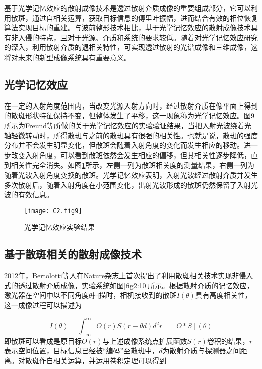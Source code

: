 基于光学记忆效应的散射成像技术是透过散射介质成像的重要组成部分，它可以利用散斑，通过自相关运算，获取目标信息的傅里叶振幅，进而结合有效的相位恢复算法实现目标的重建。与波前整形技术相比，基于光学记忆效应的散射成像技术具有非入侵的特点，且对于光源、介质和系统的要求较低。随着对光学记忆效应研究的深入，利用散射介质的退相关特性，可实现透过散射的光谱成像和三维成像，这将对未来的新型成像系统具有重要意义。

\subsection{光学记忆效应}

在一定的入射角度范围内，当改变光源入射方向时，经过散射介质在像平面上得到的散斑形状特征保持不变，但整体发生了平移，这一现象称为光学记忆效应。图9所示为Freund等所做的关于光学记忆效应的实验验证结果，当把入射光波绕着光轴轻微转动时，所得散斑与之前的散斑具有很强的相关性。也就是说，散斑的强度分布并不会发生明显变化，但散斑会随着入射角度的变化而发生相应的移动。进一步改变入射角度，可以看到散斑依然会发生相应的偏移，但其相关性逐步降低，直到相关性完全消失。如图\ref{fig2:9}所示，左侧一列为散斑相关度的测量结果，右侧一列为随着光波入射角度变换的散斑。光学记忆效应表明，入射光波经过散射介质并发生多次散射后，随着入射角度在小范围变化，出射光波形成的散斑仍然保留了入射光波的有效信息。

\begin{figure}[htp]
	\centering
	\texttt{[image: C2.fig9]}
	\caption{光学记忆效应实验结果}
	\label{fig2:9}
\end{figure}

\subsection{基于散斑相关的散射成像技术}

2012年，Bertolotti等人在Nature杂志上首次提出了利用散斑相关技术实现非侵入式的透过散射介质成像，实验系统如图\ref{fig2:10}所示。根据散射介质的记忆效应，激光器在空间中以不同角度$\theta$扫描时，相机接收到的散斑$I(\theta)$具有高度相关性，这一成像过程可以描述为

\begin{equation}
  I(\theta)= \int_{-\infty}^{\infty} O(r)S(r-\theta d) d^2 r = [O*S](\theta)
\label{eq:2.4}
\end{equation}
即散斑可以看成是原目标$O(r)$与上述成像系统点扩展函数$S(r)$卷积的结果，$r$表示空间位置，目标信息已经被“编码”至散斑中，$d$为散射介质与探测器之间距离。对散斑作自相关运算，并运用卷积定理可以得到

